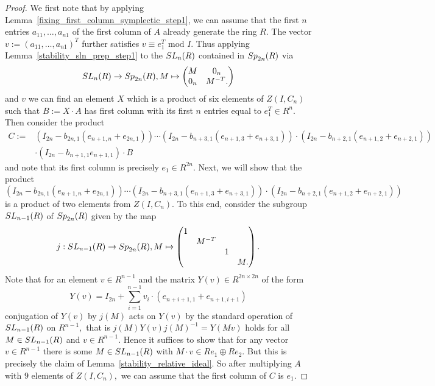 \documentclass[10pt,a4paper]{amsart}
\begin{document}
\begin{proof}
We first note that by applying Lemma~\ref{fixing_first_column_symplectic_step1}, we can assume that the first $n$ entries $a_{11},\dots,a_{n1}$ of the first column of $A$ already generate the ring $R.$ The vector $v:=(a_{11},\dots,a_{n1})^T$ further satisfies $v\equiv e_1^T\text{ 
 mod } I$. Thus applying Lemma~\ref{stability_sln_prep_step1} to the ${\rm SL}_n(R)$ contained in ${\rm Sp}_{2n}(R)$ via
\[
{\rm SL}_n(R)\to{\rm Sp}_{2n}(R),M\mapsto
\begin{pmatrix}
M & 0_n\\
0_n & M^{-T}.
\end{pmatrix}
\]
and $v$ we can find an element $X$ which is a product of six elements of $Z(I,C_n)$ such that $B:=X\cdot A$ has first column with its first $n$ entries equal to $e_1^T\in R^n.$ Then consider the product
\begin{align*}
C:=&(I_{2n}-b_{2n,1}(e_{n+1,n}+e_{2n,1}))\cdots(I_{2n}-b_{n+3,1}(e_{n+1,3}+e_{n+3,1}))\cdot(I_{2n}-b_{n+2,1}(e_{n+1,2}+e_{n+2,1}))\\
&\cdot(I_{2n}-b_{n+1,1}e_{n+1,1})\cdot B
\end{align*}
and note that its first column is precisely $e_1\in R^{2n}.$
Next, we will show that the product 
\[
(I_{2n}-b_{2n,1}(e_{n+1,n}+e_{2n,1}))\cdots(I_{2n}-b_{n+3,1}(e_{n+1,3}+e_{n+3,1}))\cdot(I_{2n}-b_{n+2,1}(e_{n+1,2}+e_{n+2,1}))
\]
is a product of two elements from $Z(I,C_n)$. To this end, consider the subgroup ${\rm SL}_{n-1}(R)$ of ${\rm Sp}_{2n}(R)$ given by the map
\[
j:{\rm SL}_{n-1}(R)\to{\rm Sp}_{2n}(R),M\mapsto
\begin{pmatrix}
1 & & &\\
& M^{-T} & & \\
& & 1 & \\
& & & M.
\end{pmatrix}.
\]
Note that for an element $v\in R^{n-1}$ and the matrix $Y(v)\in R^{2n\times 2n}$ of the form 
\[
Y(v)=I_{2n}+\sum_{i=1}^{n-1} v_i\cdot (e_{n+i+1,1}+e_{n+1,i+1})
\]
conjugation of $Y(v)$ by $j(M)$ acts on $Y(v)$ by the standard operation of ${\rm SL}_{n-1}(R)$ on $R^{n-1},$ that is $j(M)Y(v)j(M)^{-1}=Y(Mv)$ holds for all $M\in{\rm SL}_{n-1}(R)$ and $v\in R^{n-1}.$ Hence it suffices to show that for any vector $v\in R^{n-1}$ there is some $M\in{\rm SL}_{n-1}(R)$ with $M\cdot v\in Re_1\oplus Re_2.$ But this is precisely the claim of Lemma~\ref{stability_relative_ideal}. So after multiplying $A$ with $9$ elements of $Z(I,C_n),$ we can assume that the first column of $C$ is $e_1.$ 


\end{proof}
\end{document}
